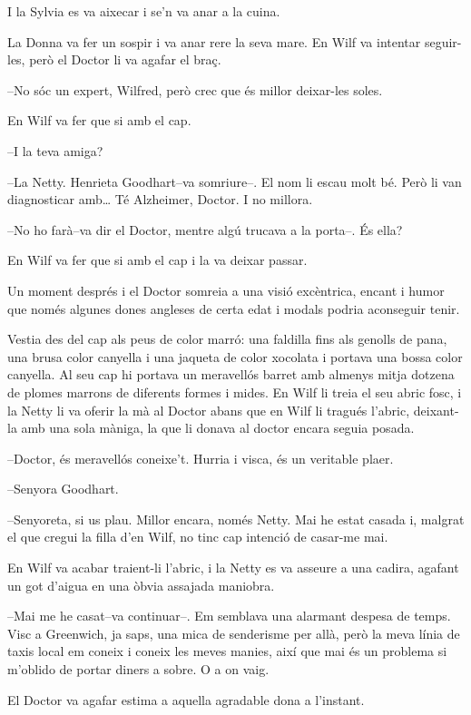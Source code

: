I la Sylvia es va aixecar i se'n va anar a la cuina.

La Donna va fer un sospir i va anar rere la seva mare. En Wilf va
intentar seguir-les, però el Doctor li va agafar el braç.

--No sóc un expert, Wilfred, però crec que és millor deixar-les soles.

En Wilf va fer que si amb el cap.

--I la teva amiga?

--La Netty. Henrieta Goodhart--va somriure--. El nom li escau molt bé.
Però li van diagnosticar amb\ldots{} Té Alzheimer, Doctor. I no millora.

--No ho farà--va dir el Doctor, mentre algú trucava a la porta--. És
ella?

En Wilf va fer que si amb el cap i la va deixar passar.

Un moment després i el Doctor somreia a una visió excèntrica, encant i
humor que només algunes dones angleses de certa edat i modals podria
aconseguir tenir.

Vestia des del cap als peus de color marró: una faldilla fins als
genolls de pana, una brusa color canyella i una jaqueta de color
xocolata i portava una bossa color canyella. Al seu cap hi portava un
meravellós barret amb almenys mitja dotzena de plomes marrons de
diferents formes i mides. En Wilf li treia el seu abric fosc, i la Netty
li va oferir la mà al Doctor abans que en Wilf li tragués l'abric,
deixant-la amb una sola màniga, la que li donava al doctor encara seguia
posada.

--Doctor, és meravellós coneixe't. Hurria i visca, és un veritable
plaer.

--Senyora Goodhart.

--Senyoreta, si us plau. Millor encara, només Netty. Mai he estat casada
i, malgrat el que cregui la filla d'en Wilf, no tinc cap intenció de
casar-me mai.

En Wilf va acabar traient-li l'abric, i la Netty es va asseure a una
cadira, agafant un got d'aigua en una òbvia assajada maniobra.

--Mai me he casat--va continuar--. Em semblava una alarmant despesa de
temps. Visc a Greenwich, ja saps, una mica de senderisme per allà, però
la meva línia de taxis local em coneix i coneix les meves manies, així
que mai és un problema si m'oblido de portar diners a sobre. O a on
vaig.

El Doctor va agafar estima a aquella agradable dona a l'instant.

